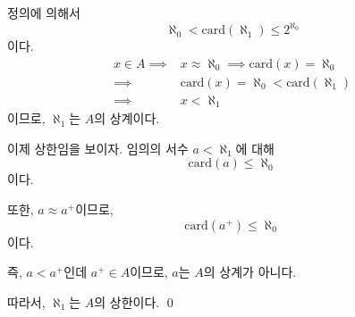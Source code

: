 \documentclass{article}
\begin{document}
정의에 의해서
$$\aleph_0 < \text{card}(\aleph_1) \le 2^{\aleph_0}$$
이다.
\begin{align*}
x \in A \implies& x \approx \aleph_0 \implies \text{card}(x) = \aleph_0
\\ \implies& \text{card}(x) = \aleph_0 < \text{card}(\aleph_1)
\\ \implies& x < \aleph_1 \tag{문제 3.6.5.}
\end{align*}
이므로, $\aleph_1$는 $A$의 상계이다.

이제 상한임을 보이자. 임의의 서수 $a < \aleph_1$에 대해
$$\text{card}(a) \le \aleph_0$$이다. 

또한, $a \approx a^+$이므로, 
$$\text{card}(a^+) \le \aleph_0$$이다. 

즉, $a < a^+$인데 $a^+ \in A$이므로, $a$는 $A$의 상계가 아니다.

따라서, $\aleph_1$는 $A$의 상한이다. \qed

\end{document}
